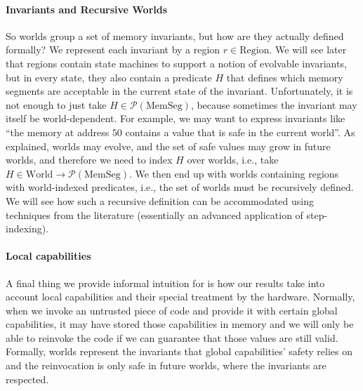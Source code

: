 \documentclass[format=acmsmall, review=true, screen=true]{acmart}
\newcommand{\powerset}[1]{\mathcal{P}(#1)}
\newcommand{\plaindom}[1]{\mathrm{#1}}
\newcommand{\HeapSegments}{\plaindom{MemSeg}}
\newcommand{\MemSegments}{\HeapSegments}
\newcommand{\Regions}{\plaindom{Region}}
\newcommand{\Worlds}{\plaindom{World}}
\newenvironment{toplas}{}{}
\begin{document}
\begin{toplas}
\paragraph{Invariants and Recursive Worlds}
So worlds group a set of memory invariants, but how are they actually
defined formally? We represent each invariant by a region
$r \in \Regions$. We will see later that regions contain state
machines to support a notion of evolvable invariants, but in every
state, they also contain a predicate $H$ that defines which memory
segments are acceptable in the current state of the invariant.
Unfortunately, it is not enough to just take
$H \in \powerset{\MemSegments}$, because sometimes the invariant may
itself be world-dependent. For example, we may want to express
invariants like ``the memory at address $50$ contains a value that is
safe in the current world''. As explained, worlds may evolve, and the
set of safe values may grow in future worlds, and therefore we need to
index $H$ over worlds, i.e., take
$H \in \Worlds \rightarrow \powerset{\MemSegments}$. We then end up
with worlds containing regions with world-indexed predicates,
i.e., the set of worlds must be recursively defined. We will see how such a recursive
definition can be accommodated using techniques from the
literature (essentially an advanced application of step-indexing).

\paragraph{Local capabilities}
A final thing we provide informal intuition for is how our results take into account local
capabilities and their special treatment by the hardware. Normally, when we
invoke an untrusted piece of code and provide it with certain global
capabilities, it may have stored those capabilities in memory and we will only
be able to reinvoke the code if we can guarantee that those values are still
valid. Formally, worlds represent the invariants that global capabilities'
safety relies on and the reinvocation is only safe in future worlds, where the
invariants are respected.


\end{toplas}
\end{document}
